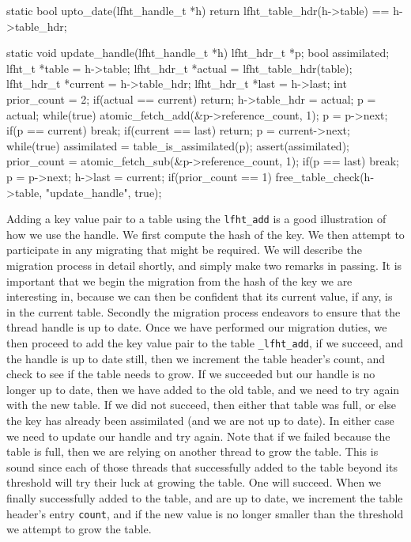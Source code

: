 \begin{center}
\begin{clisting}
static bool upto_date(lfht_handle_t *h){
  return lfht_table_hdr(h->table) == h->table_hdr;
}

static void update_handle(lfht_handle_t *h){
  lfht_hdr_t *p;
  bool assimilated;
  lfht_t *table = h->table;
  lfht_hdr_t *actual = lfht_table_hdr(table);
  lfht_hdr_t *current  = h->table_hdr;
  lfht_hdr_t *last = h->last;
  int prior_count = 2;
  if(actual == current){
    return;
  }
  h->table_hdr = actual;
  p = actual;
  while(true){
    atomic_fetch_add(&p->reference_count, 1);
    p = p->next;
    if(p == current){ break; }
  }
  if(current == last){  return; }
  p = current->next;
  while(true){
    assimilated = table_is_assimilated(p);
    assert(assimilated);
    prior_count = atomic_fetch_sub(&p->reference_count, 1);
    if(p == last){ break; }
    p = p->next;
  }
  h->last = current;
  if(prior_count == 1){
    free_table_check(h->table, "update_handle", true);
  }
}
\end{clisting}
\end{center}

Adding a key value pair to a table using the \texttt{lfht\_add} is a good illustration of
how we use the handle. We first compute the hash of the key. We then attempt to participate in any
migrating that might be required. We will describe the migration process in detail shortly, and
simply make two remarks in passing. It is important that we begin the migration from the hash of the
key we are interesting in, because we can then be confident that its current value, if any, is in
the current table. Secondly the migration process endeavors to ensure that the thread handle is up to date.
Once we have performed our migration duties, we then proceed to add the key value pair to the
table \texttt{\_lfht\_add}, if we succeed, and the handle is up to date still, then we increment
the table header's count, and check to see if the table needs to grow.
If we succeeded but our handle is no longer up to date, then we have added to the old table,
and we need to try again with the new table. If we did not succeed, then either that table
was full, or else the key has already been assimilated (and we are not  up to date). In either case
we need to update our handle and try again. Note that if we failed because the table is full, then
we are relying on another thread to grow the table. This is sound since each of those threads that
successfully added to the table beyond its threshold will try their luck at growing the table. One will
succeed. When we finally successfully added to the table, and are up to date, we increment the
table header's entry \texttt{count}, and if the new value is no longer smaller than the threshold
we attempt to grow the table.




